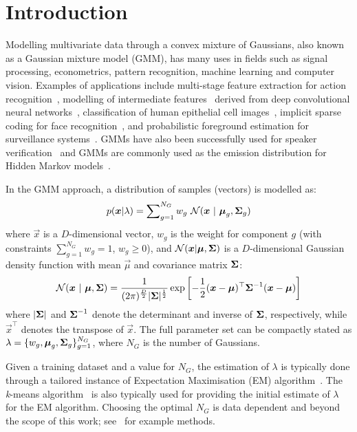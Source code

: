 \section{Introduction}

Modelling multivariate data through a convex mixture of Gaussians, also known as a Gaussian mixture model (GMM),
has many uses in fields such as signal processing, econometrics, pattern recognition, machine learning and computer vision.
Examples of applications include
multi-stage feature extraction for action recognition~\cite{Carvajal_2016a},
modelling of intermediate features~\cite{Ge_ICIP_2015} derived from deep convolutional neural networks~\cite{Ge_2016,LeCun_Nature_2015},
classification of human epithelial cell images~\cite{Wiliem_PR_2014},
implicit sparse coding for face recognition~\cite{Wong_2014},
and probabilistic foreground estimation for surveillance systems~\cite{Reddy_2013}.
GMMs have also been successfully used for speaker
verification~\cite{Reynolds_2000} and GMMs are commonly used as the emission
distribution for Hidden Markov models~\cite{Bilmes98}.

In the GMM approach, a distribution of samples (vectors) is modelled as:
%
\begin{equation}
  p(\Vec{x} | \lambda) = \sum\nolimits_{g=1}^{N_G} w_g ~ {{\mathcal{N}}}( \Vec{x} ~|~ \Vec{\mu}_g, \Mat{\Sigma}_g )
  \label{eqn:gmm_prob}
\end{equation}%
%
where $\Vec{x}$ is a $D$-dimensional vector,
$w_g$ is the weight for component $g$ (with constraints $\sum\nolimits_{g=1}^{N_G} w_g = 1$, $w_g \geq 0$),
and
${{\mathcal{N}}}( {\boldsymbol{x}} | {\boldsymbol{\mu}}, {\boldsymbol{\Sigma}})$ is a $D$-dimensional Gaussian density function with mean $\Vec{\mu}$ and covariance matrix ${\boldsymbol{\Sigma}}$:
%
\begin{equation}
  {{\mathcal{N}}}( \Vec{x} ~|~ \Vec{\mu}, \Mat{\Sigma} )  = 
  \frac{1}{ (2\pi)^{\frac{D}{2}} | \Mat{\Sigma}|^{\frac{1}{2}} }
  \exp \left[ -\frac{1}{2} (\Vec{x}-\Vec{\mu})^\top \Mat{\Sigma}^{-1} (\Vec{x}-\Vec{\mu}) \right]
  \label{eqn:gaussian}
\end{equation}%
%
where $|{\boldsymbol{\Sigma}}|$ and ${\boldsymbol{\Sigma}}^{-1}$ denote the determinant and inverse of ${\boldsymbol{\Sigma}}$, respectively,
while $\Vec{x}^\top$ denotes the transpose of $\Vec{x}$.
The full parameter set can be compactly stated as $\lambda = \{ w_g, {\boldsymbol{\mu}}_g, {\boldsymbol{\Sigma}}_g \}_{g=1}^{N_G}$,
where $N_G$ is the number of Gaussians.

Given a training dataset and a value for $N_G$,
the estimation of $\lambda$ is typically done through a
tailored instance of Expectation Maximisation (EM) algorithm~\cite{Dempster77, McLachlan-2008, Moon96, Redner84}.
The {\it k}-means algorithm~\cite{Bishop_2006,Duda01,Linde80} is also typically used for providing the initial estimate of $\lambda$ for the EM algorithm.
Choosing the optimal $N_G$ is data dependent and beyond the scope of this work; see~\cite{Hamerly_2003,Pelleg_2000} for example methods.

